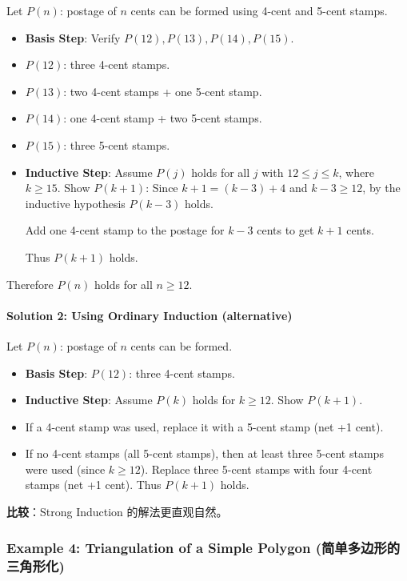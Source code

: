 \documentclass[10pt,a4paper,openany]{ctexbook}
\theoremstyle{definition}
\theoremstyle{remark}
\renewenvironment{quote}
  {\list{}{\leftmargin=1em\rightmargin=0pt\topsep=0.5pt\partopsep=0pt}\item[]}
  {\endlist}
\begin{document}
Let $P(n)$: postage of $n$ cents can be formed using 4-cent and 5-cent stamps.
\begin{itemize}
\item \textbf{Basis Step}: Verify $P(12), P(13), P(14), P(15)$.
\item $P(12)$: three 4-cent stamps.
\item $P(13)$: two 4-cent stamps + one 5-cent stamp.
\item $P(14)$: one 4-cent stamp + two 5-cent stamps.
\item $P(15)$: three 5-cent stamps.

\item \textbf{Inductive Step}: Assume $P(j)$ holds for all $j$ with $12 \le j \le k$, where $k \ge 15$.
Show $P(k+1)$: Since $k+1 = (k-3) + 4$ and $k-3 \ge 12$, by the inductive hypothesis $P(k-3)$ holds.

Add one 4-cent stamp to the postage for $k-3$ cents to get $k+1$ cents.

Thus $P(k+1)$ holds.


\end{itemize}

Therefore $P(n)$ holds for all $n \ge 12$.
\paragraph{Solution 2: Using Ordinary Induction (alternative)}

Let $P(n)$: postage of $n$ cents can be formed.
\begin{itemize}
\item \textbf{Basis Step}: $P(12)$: three 4-cent stamps.
\item \textbf{Inductive Step}: Assume $P(k)$ holds for $k \ge 12$. Show $P(k+1)$.
\item If a 4-cent stamp was used, replace it with a 5-cent stamp (net +1 cent).
\item If no 4-cent stamps (all 5-cent stamps), then at least three 5-cent stamps were used (since $k \ge 12$). Replace three 5-cent stamps with four 4-cent stamps (net +1 cent).
Thus $P(k+1)$ holds.


\end{itemize}

\begin{quote}
\textbf{比较}：Strong Induction 的解法更直观自然。

\end{quote}
\vspace{-2pt}

\subsubsection{Example 4: Triangulation of a Simple Polygon (简单多边形的三角形化)}
\end{document}
